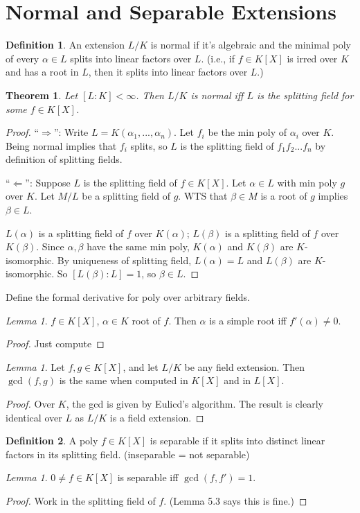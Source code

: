\documentclass{article}
\theoremstyle{definition}
\newtheorem*{defn*}{Definition}
\theoremstyle{remark}
\newtheorem{lem}[defn]{Lemma}
\theoremstyle{plain}
\newtheorem{thm}[defn]{Theorem}
\begin{document}
\section{Normal and Separable Extensions}
\begin{defn*}
An extension $L/K$ is normal if it's algebraic and the minimal poly of every $\alpha\in L$ splits into linear factors over $L$. (i.e., if $f\in K[X]$ is irred over $K$ and has a root in $L$, then it splits into linear factors over $L$.)
\end{defn*}
\begin{thm}
Let $[L:K]<\infty$. Then $L/K$ is normal iff $L$ is the splitting field for some $f\in K[X]$.
\end{thm}
\begin{proof}
``$\Rightarrow$'': Write $L=K(\alpha_1,...,\alpha_n)$. Let $f_i$ be the min poly of $\alpha_i$ over $K$. Being normal implies that $f_i$ splits, so $L$ is the splitting field of $f_1f_2...f_n$ by definition of splitting fields.

``$\Leftarrow$'': Suppose $L$ is the splitting field of $f\in K[X]$. Let $\alpha\in L$ with min poly $g$ over $K$. Let $M/L$ be a splitting field of $g$. WTS that $\beta\in M$ is a root of $g$ implies $\beta\in L$.

$L(\alpha)$ is a splitting field of $f$ over $K(\alpha)$; $L(\beta)$ is a splitting field of $f$ over $K(\beta)$. Since $\alpha,\beta$ have the same min poly, $K(\alpha)$ and $K(\beta)$ are $K$-isomorphic. By uniqueness of splitting field, $L(\alpha)=L$ and $L(\beta)$ are $K$-isomorphic. So $[L(\beta):L]=1$, so $\beta\in L$.
\end{proof}

Define the formal derivative for poly over arbitrary fields.

\begin{lem}
    $f\in K[X]$, $\alpha\in K$ root of $f$. Then $\alpha$ is a simple root iff $f'(\alpha)\neq 0$.
\end{lem}
\begin{proof}Just compute
\end{proof}

\begin{lem}
    Let $f,g\in K[X]$, and let $L/K$ be any field extension. Then $\gcd(f,g)$ is the same when computed in $K[X]$ and in $L[X]$.
\end{lem}
\begin{proof}
    Over $K$, the gcd is given by Eulicd's algorithm. The result is clearly identical over $L$ as $L/K$ is a field extension.
\end{proof}
\begin{defn*}
    A poly $f\in K[X]$ is separable if it splits into distinct linear factors in its splitting field. (inseparable = not separable)
\end{defn*}
\begin{lem}
    $0\neq f\in K[X]$ is separable iff $\gcd(f,f')=1$.
\end{lem}
\begin{proof}Work in the splitting field of $f$. (Lemma 5.3 says this is fine.)
\end{proof}
\end{document}
